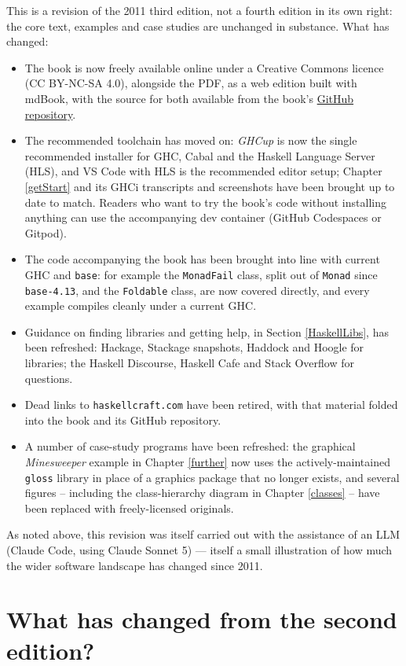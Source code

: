 This is a revision of the 2011 third edition, not a fourth edition in
its own right: the core text, examples and case studies are unchanged
in substance. What has changed:
\begin{itemize}
\item
The book is now freely available online under a Creative Commons
licence (CC BY-NC-SA 4.0), alongside the PDF, as a web edition built
with mdBook, with the source for both available from the book's
\href{https://github.com/simonjohnthompson/haskellcraft}{GitHub repository}.
\item
The recommended toolchain has moved on: \emph{GHCup} is now the
single recommended installer for GHC, Cabal and the Haskell Language
Server (HLS), and VS Code with HLS is the recommended editor setup;
Chapter \ref{getStart} and its GHCi transcripts and screenshots have
been brought up to date to match. Readers who want to try the book's
code without installing anything can use the accompanying dev
container (GitHub Codespaces or Gitpod).
\item
The code accompanying the book has been brought into line with
current GHC and \texttt{base}: for example the \texttt{MonadFail}
class, split out of \texttt{Monad} since \texttt{base-4.13}, and the
\texttt{Foldable} class, are now covered directly, and every example
compiles cleanly under a current GHC.
\item
Guidance on finding libraries and getting help, in Section
\ref{HaskellLibs}, has been refreshed: Hackage, Stackage snapshots,
Haddock and Hoogle for libraries; the Haskell Discourse, Haskell Cafe
and Stack Overflow for questions.
\item
Dead links to \texttt{haskellcraft.com} have been retired, with that
material folded into the book and its GitHub repository.
\item
A number of case-study programs have been refreshed: the graphical
\emph{Minesweeper} example in Chapter \ref{further} now uses the
actively-maintained \texttt{gloss} library in place of a graphics
package that no longer exists, and several figures -- including the
class-hierarchy diagram in Chapter \ref{classes} -- have been
replaced with freely-licensed originals.
\end{itemize}
As noted above, this revision was itself carried out with the
assistance of an LLM (Claude Code, using Claude Sonnet 5) --- itself
a small illustration of how much the wider software landscape has
changed since 2011.

\section*{What has changed from the second edition?}

